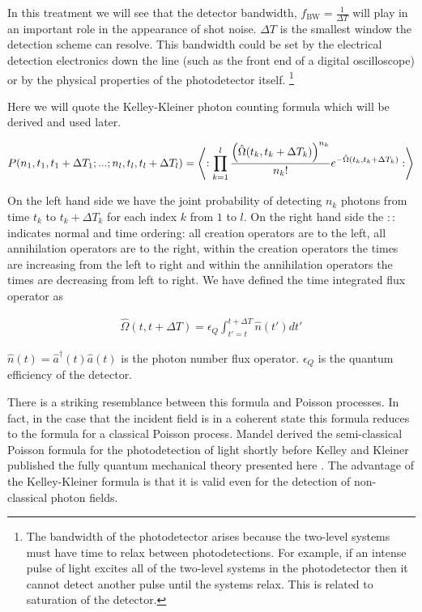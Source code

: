 \documentclass[12pt]{article}
\newcommand{\ep}{\epsilon}
\begin{document}
In this treatment we will see that the detector bandwidth, $f_{\text{BW}} = \frac{1}{\Delta T}$ will play in an important role in the appearance of shot noise. $\Delta T$ is the smallest window the detection scheme can resolve. This bandwidth could be set by the electrical detection electronics down the line (such as the front end of a digital oscilloscope) or by the physical properties of the photodetector itself. \footnote{The bandwidth of the photodetector arises because the two-level systems must have time to relax between photodetections. For example, if an intense pulse of light excites all of the two-level systems in the photodetector then it cannot detect another pulse until the systems relax. This is related to saturation of the detector.}

Here we will quote the Kelley-Kleiner photon counting formula which will be derived and used later.

\begin{align}
P(n_1,t_1,t_1+\Delta T_1;...;n_l,t_l,t_l+\Delta T_l) = \Braket{:\prod_{k=1}^l \frac{\left(\hat{\Omega}(t_k,t_k+\Delta T_k)\right)^{n_k}}{n_k!} e^{-\hat{\Omega}(t_k,t_k+\Delta T_k)}:}
\end{align}

On the left hand side we have the joint probability of detecting $n_k$ photons from time $t_k$ to $t_k+\Delta T_k$ for each index $k$ from $1$ to $l$. On the right hand side the $::$ indicates normal and time ordering: all creation operators are to the left, all annihilation operators are to the right, within the creation operators the times are increasing from the left to right and within the annihilation operators the times are decreasing from left to right.
We have defined the time integrated flux operator as

\begin{align}
\hat{\Omega}(t,t+\Delta T) = \ep_Q \int_{t'=t}^{t+\Delta T} \hat{n}(t') dt'
\end{align}

 $\hat{n}(t) = \hat{a}^{\dag}(t) \hat{a}(t)$ is the photon number flux operator. $\ep_Q$ is the quantum efficiency of the detector.

There is a striking resemblance between this formula and  Poisson processes. In fact, in the case that the incident field is in a coherent state this formula reduces to the formula for a classical Poisson process. Mandel derived the semi-classical Poisson formula for the photodetection of light shortly before Kelley and Kleiner published the fully quantum mechanical theory presented here \cite{Mandel1958}. The advantage of the Kelley-Kleiner formula is that it is valid even for the detection of non-classical photon fields. 
\end{document}
